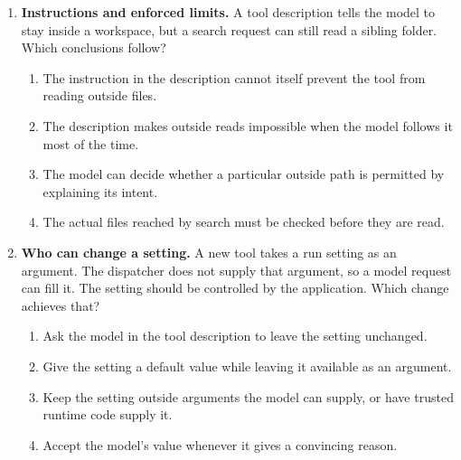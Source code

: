 \begin{enumerate}[start=31,itemsep=0.7\baselineskip]
\item\label{exercise:33} \begin{minipage}[t]{\linewidth}
\textbf{Instructions and enforced limits.} A tool description tells the model to stay inside a workspace, but a search request can still read a sibling folder. Which conclusions follow?
\begin{enumerate}[label=\textnormal{(\Alph*)},leftmargin=*,itemsep=0pt]
\item The instruction in the description cannot itself prevent the tool from reading outside files.
\item The description makes outside reads impossible when the model follows it most of the time.
\item The model can decide whether a particular outside path is permitted by explaining its intent.
\item The actual files reached by search must be checked before they are read.
\end{enumerate}
\end{minipage}

\item\label{exercise:34} \begin{minipage}[t]{\linewidth}
\textbf{Who can change a setting.} A new tool takes a run setting as an argument. The dispatcher does not supply that argument, so a model request can fill it. The setting should be controlled by the application. Which change achieves that?
\begin{enumerate}[label=\textnormal{(\Alph*)},leftmargin=*,itemsep=0pt]
\item Ask the model in the tool description to leave the setting unchanged.
\item Give the setting a default value while leaving it available as an argument.
\item Keep the setting outside arguments the model can supply, or have trusted runtime code supply it.
\item Accept the model's value whenever it gives a convincing reason.
\end{enumerate}
\end{minipage}


\end{enumerate}

